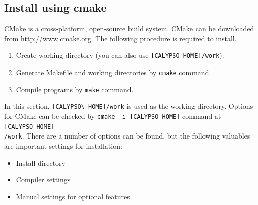 \subsection{Install using cmake}
CMake is a cross-platform, open-source build system. CMake can be downloaded from \url{http://www.cmake.org}. The following procedure is required to install.
%
\begin{enumerate}
\item Create working directory (you can also use \verb|[CALYPSO_HOME]/work|).
\item Generate Makefile and working directories by {\tt cmake} command.
\item Compile programs by {\tt make} command.
\end{enumerate}
%
In this section, \verb|[CALYPSO\_HOME]/work| is used as the working directory.
Options for CMake can be checked by \verb|cmake -i [CALYPSO_HOME]| command at \verb|[CALYPSO_HOME]| \\
\verb|/work|. There are a number of options can be found, but the following valuables are important settings for installation:
%
\begin{itemize}
\item Install directory

\item Compiler settings

\item Manual settings for optional features
%
\end{itemize}
